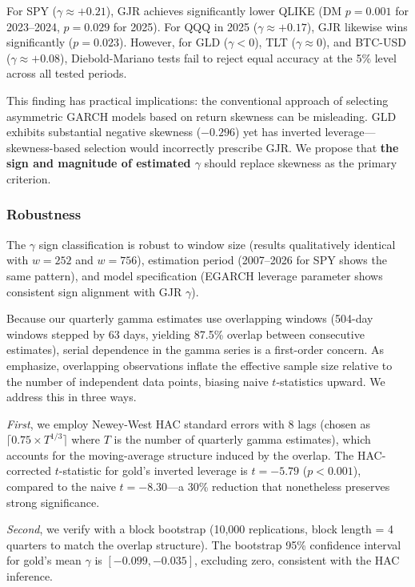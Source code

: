 For SPY ($\gamma \approx +0.21$), GJR achieves significantly lower QLIKE (DM $p = 0.001$ for 2023--2024, $p = 0.029$ for 2025). For QQQ in 2025 ($\gamma \approx +0.17$), GJR likewise wins significantly ($p = 0.023$). However, for GLD ($\gamma < 0$), TLT ($\gamma \approx 0$), and BTC-USD ($\gamma \approx +0.08$), Diebold-Mariano tests fail to reject equal accuracy at the 5\% level across all tested periods.

This finding has practical implications: the conventional approach of selecting asymmetric GARCH models based on return skewness can be misleading. GLD exhibits substantial negative skewness ($-0.296$) yet has inverted leverage---skewness-based selection would incorrectly prescribe GJR. We propose that \textbf{the sign and magnitude of estimated $\gamma$} should replace skewness as the primary criterion.

\subsubsection{Robustness}

The $\gamma$ sign classification is robust to window size (results qualitatively identical with $w = 252$ and $w = 756$), estimation period (2007--2026 for SPY shows the same pattern), and model specification (EGARCH leverage parameter shows consistent sign alignment with GJR $\gamma$).

Because our quarterly gamma estimates use overlapping windows (504-day windows stepped by 63 days, yielding 87.5\% overlap between consecutive estimates), serial dependence in the gamma series is a first-order concern. As \citet{harri2009} emphasize, overlapping observations inflate the effective sample size relative to the number of independent data points, biasing naive $t$-statistics upward. We address this in three ways.

\textit{First}, we employ Newey-West HAC standard errors \citep{newey1987} with 8 lags (chosen as $\lceil 0.75 \times T^{1/3} \rceil$ where $T$ is the number of quarterly gamma estimates), which accounts for the moving-average structure induced by the overlap. The HAC-corrected $t$-statistic for gold's inverted leverage is $t = -5.79$ ($p < 0.001$), compared to the naive $t = -8.30$---a 30\% reduction that nonetheless preserves strong significance.

\textit{Second}, we verify with a block bootstrap (10,000 replications, block length = 4 quarters to match the overlap structure). The bootstrap 95\% confidence interval for gold's mean $\gamma$ is $[-0.099, -0.035]$, excluding zero, consistent with the HAC inference.

